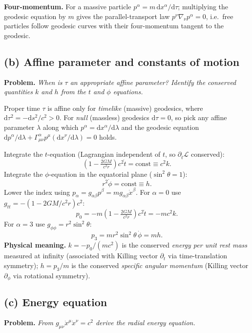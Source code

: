 \documentclass[11pt]{article}
\newcommand{\de}{\mathrm{d}}
\begin{document}
\textbf{Four-momentum.} For a massive particle $p^\alpha = m\,\de x^\alpha/\de\tau$; multiplying the geodesic equation by $m$ gives the parallel-transport law $p^\nu\nabla_\nu p^\alpha = 0$, i.e.\ free particles follow geodesic curves with their four-momentum tangent to the geodesic.

\subsection*{(b) Affine parameter and constants of motion}

\textbf{Problem.} \emph{When is $\tau$ an appropriate affine parameter? Identify the conserved quantities $k$ and $h$ from the $t$ and $\phi$ equations.}

Proper time $\tau$ is affine only for \emph{timelike} (massive) geodesics, where $\de\tau^2 = -\de s^2/c^2 > 0$. For \emph{null} (massless) geodesics $\de\tau = 0$, so pick any affine parameter $\lambda$ along which $p^\alpha = \de x^\alpha/\de\lambda$ and the geodesic equation $\de p^\alpha/\de\lambda + \Gamma^\alpha_{\mu\nu}p^\mu(\de x^\nu/\de\lambda) = 0$ holds.

Integrate the $t$-equation (Lagrangian independent of $t$, so $\partial_{\dot t}\mathcal L$ conserved):
\[
\!\left(1-\tfrac{2GM}{c^2 r}\right)c^2\dot t = \text{const} \equiv c^2 k.
\]
Integrate the $\phi$-equation in the equatorial plane ($\sin^2\theta = 1$):
\[
r^2\dot\phi = \text{const} \equiv h.
\]
Lower the index using $p_\alpha = g_{\alpha\beta}p^\beta = m g_{\alpha\beta}\dot x^\beta$. For $\alpha=0$ use $g_{tt}=-(1-2GM/c^2r)c^2$:
\[
p_0 = -m\!\left(1-\tfrac{2GM}{c^2 r}\right)c^2\dot t = -mc^2 k.
\]
For $\alpha=3$ use $g_{\phi\phi}=r^2\sin^2\theta$:
\[
p_3 = m r^2\sin^2\theta\,\dot\phi = m h.
\]
\textbf{Physical meaning.} $k = -p_0/(mc^2)$ is the conserved \emph{energy per unit rest mass} measured at infinity (associated with Killing vector $\partial_t$ via time-translation symmetry); $h = p_3/m$ is the conserved \emph{specific angular momentum} (Killing vector $\partial_\phi$ via rotational symmetry).

\subsection*{(c) Energy equation}

\textbf{Problem.} \emph{From $g_{\mu\nu}\dot x^\mu\dot x^\nu = c^2$ derive the radial energy equation.}
\end{document}
